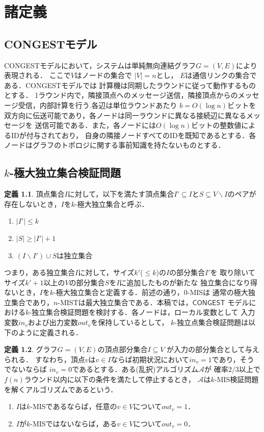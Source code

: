 \documentclass[12pt]{thesis}
\newcommand{\CONGEST}{\textsf{CONGEST}}
\newcommand{\Inp}{\mathit{in}}
\newcommand{\Out}{\mathit{out}}
\theoremstyle{definition}
\newtheorem{definition}{定義}[chapter]
\begin{document}
\chapter{諸定義}

\section{{\CONGEST}モデル}
{\CONGEST}モデルにおいて，システムは単純無向連結グラフ$G =  (V,E)$により表現される．
ここで$V$はノードの集合で $|V| = n$とし， $E$は通信リンクの集合である．{\CONGEST}モデルでは
計算機は同期したラウンドに従って動作するものとする．
1ラウンド内で，隣接頂点へのメッセージ送信，隣接頂点からのメッセージ受信，内部計算を行う.各辺は単位ラウンドあたり
$b = O(\log n)$ビットを双方向に伝送可能であり，各ノードは同一ラウンドに異なる接続辺に異なるメッセージを
送信可能である．また，各ノードには$O(\log n)$ビットの整数値によるIDが付与されており，
自身の隣接ノードすべてのIDを既知であるとする．各ノードはグラフのトポロジに関する事前知識を持たないものとする．

\section{$k$-極大独立集合検証問題}
\begin{definition}
頂点集合$I$に対して，以下を満たす頂点集合$I' \subseteq I$と$S\subseteq V \backslash I$のペアが
存在しないとき，$I$を$k$-極大独立集合と呼ぶ．
\begin{enumerate}
\item $|I'| \leq k$
\item $|S| \geq |I'| + 1$
\item $(I \backslash I') \cup S$は独立集合
\end{enumerate}
\end{definition}
つまり，ある独立集合$I$に対して，サイズ$k'$($\leq k$)の$I$の部分集合$I'$を
取り除いてサイズ$k' + 1$以上の$V$の部分集合$S$を$I$に追加したものが新たな
独立集合になり得ないとき，$I$を$k$-極大独立集合と定義する．前述の通り，$0$-MISは
通常の極大独立集合であり，$n$-MISTは最大独立集合である．本稿では，${\CONGEST}$
モデルにおける$k$-独立集合検証問題を検討する．各ノードは，ローカル変数として
入力変数$\Inp_v$および出力変数$\Out_v$を保持しているとして，
$k$-独立点集合検証問題は以下のように定義される．

\begin{definition}
グラフ$G=(V,E)$の頂点部分集合$I \subseteq V$ が入力の部分集合として与えられる．
すなわち，頂点$v$は$v\in I$ならば初期状況において$\Inp_v = 1$であり，そうでないならば
$\Inp_v = 0$であるとする．ある(乱択)アルゴリズム$\mathcal{A}$が
確率$2/3$以上で$f(n)$ラウンド以内に以下の条件を満たして停止するとき，
$\mathcal{A}$は$k$-MIS検証問題を解くアルゴリズムであるという．
\begin{enumerate}
\item $I$は$k$-MISであるならば，任意の$v \in V$について$\Out_v = 1$．
\item $I$が$k$-MISではないならば，ある$v \in V$について$\Out_v = 0$．
\end{enumerate}
\end{definition}
\end{document}
